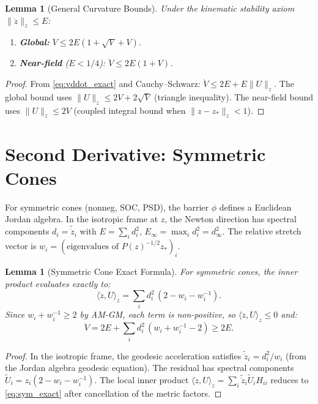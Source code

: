 \documentclass[11pt]{article}
\newtheorem{lemma}[theorem]{Lemma}
\begin{document}
\begin{lemma}[General Curvature Bounds]
\label{lem:curvature_general}
Under the kinematic stability axiom $\|\ddot{z}\|_z \le E$:
\begin{enumerate}
    \item \textbf{Global:}
    $\ddot{V} \le 2E(1 + \sqrt{V} + V)$.
    \item \textbf{Near-field} ($E < 1/4$):
    $\ddot{V} \le 2E(1 + V)$.
\end{enumerate}
\end{lemma}

\begin{proof}
From \eqref{eq:vddot_exact} and Cauchy--Schwarz:
$\ddot{V} \le 2E + E\|U\|_z$.  The global bound uses
$\|U\|_z \le 2V + 2\sqrt{V}$ (triangle inequality).  The near-field
bound uses $\|U\|_z \le 2V$ (coupled integral bound when
$\|z-z_*\|_z < 1$).
\end{proof}

\section{Second Derivative: Symmetric Cones}

For symmetric cones (nonneg, SOC, PSD), the barrier $\phi$ defines a
Euclidean Jordan algebra.  In the isotropic frame at $z$, the Newton
direction has spectral components $d_i = \tilde{\dot{z}}_i$ with
$E = \sum_i d_i^2$, $E_\infty = \max_i d_i^2 = d_\infty^2$.  The
relative stretch vector is $w_i = (\text{eigenvalues of } P(z)^{-1/2}z_*)_i$.

\begin{lemma}[Symmetric Cone Exact Formula]
\label{lem:sym_exact}
For symmetric cones, the inner product evaluates exactly to:
\begin{equation} \label{eq:sym_exact}
    \langle \ddot{z}, U \rangle_z = \sum_i d_i^2\,(2 - w_i - w_i^{-1}).
\end{equation}
Since $w_i + w_i^{-1} \ge 2$ by AM-GM, each term is non-positive, so
$\langle \ddot{z}, U \rangle_z \le 0$ and:
\begin{equation}
    \ddot{V} = 2E + \sum_i d_i^2\,(w_i + w_i^{-1} - 2) \ge 2E.
\end{equation}
\end{lemma}

\begin{proof}
In the isotropic frame, the geodesic acceleration satisfies
$\tilde{\ddot{z}}_i = d_i^2/w_i$ (from the Jordan algebra geodesic
equation).  The residual has spectral components
$\tilde{U}_i = z_i(2 - w_i - w_i^{-1})$.  The local inner product
$\langle \ddot{z}, U \rangle_z = \sum_i \tilde{\ddot{z}}_i
\tilde{U}_i H_{ii}$ reduces to \eqref{eq:sym_exact} after
cancellation of the metric factors.
\end{proof}
\end{document}
